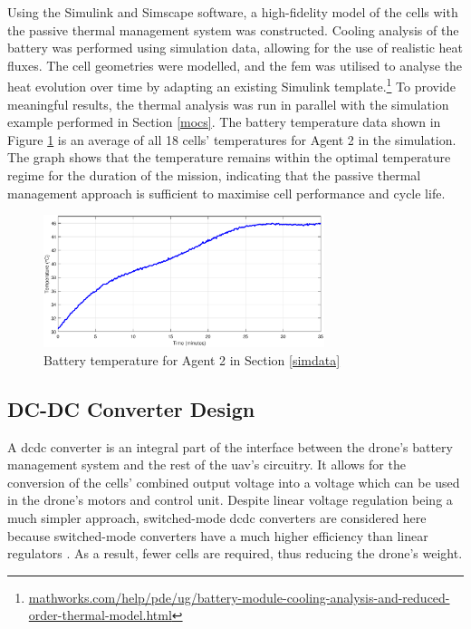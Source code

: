 Using the Simulink and Simscape software, a high-fidelity model of the cells with the passive thermal management system was constructed. Cooling analysis of the battery was performed using simulation data, allowing for the use of realistic heat fluxes. The cell geometries were modelled, and the \gls{fem} was utilised to analyse the heat evolution over time by adapting an existing Simulink template.\footnote{\hyperlink{https://mathworks.com/help/pde/ug/battery-module-cooling-analysis-and-reduced-order-thermal-model.html}{mathworks.com/help/pde/ug/battery-module-cooling-analysis-and-reduced-order-thermal-model.html}} To provide meaningful results, the thermal analysis was run in parallel with the simulation example performed in Section \ref{mocs}. The battery temperature data shown in Figure \ref{fig:battemp} is an average of all 18 cells' temperatures for Agent 2 in the simulation. The graph shows that the temperature remains within the optimal temperature regime for the duration of the mission, indicating that the passive thermal management approach is sufficient to maximise cell performance and cycle life.

\begin{figure}[H]
\centering
\includegraphics[width=0.73\textwidth]{figs/Samuel/Figures/batttemp.eps}
\caption{Battery temperature for Agent 2 in Section \ref{simdata}}
\label{fig:battemp}
\end{figure}

\subsection{DC-DC Converter Design}

A \acrshort{dcdc} converter is an integral part of the interface between the drone's battery management system and the rest of the \acrshort{uav}'s circuitry. It allows for the conversion of the cells' combined output voltage into a voltage which can be used in the drone's motors and control unit. Despite linear voltage regulation being a much simpler approach, switched-mode \acrshort{dcdc} converters are considered here because switched-mode converters have a much higher efficiency than linear regulators \cite{rogers2024powerelectronics}. As a result, fewer cells are required, thus reducing the drone's weight.

